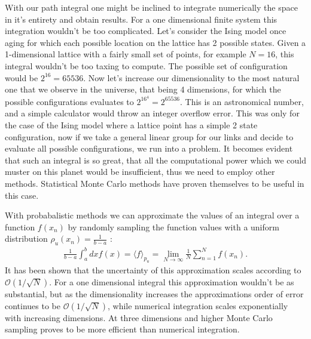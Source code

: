 \documentclass[english,twoside,openright]{UH_TCM_MSc}
\begin{document}
With our path integral one might be inclined to integrate numerically the space in it's entirety and obtain results. For a one dimensional finite system this integration wouldn't be too complicated. Let's consider the Ising model once aging for which each possible location on the lattice has 2 possible states. Given a 1-dimensional lattice with a fairly small set of points, for example $N=16$, this integral wouldn't be too taxing to compute. The possible set of configuration would be $2^{16}=65536$. Now let's increase our dimensionality to the most natural one that we observe in the universe, that being 4 dimensions, for which the possible configurations evaluates to $2^{16^4} = 2^{65536}$. This is an astronomical number, and a simple calculator would throw an integer overflow error. This was only for the case of the Ising model where a lattice point has a simple 2 state configuration, now if we take a general linear group for our links and decide to evaluate all possible configurations, we run into a problem. It becomes evident that such an integral is so great, that all the computational power which we could muster on this planet would be insufficient, thus we need to employ other methods. Statistical Monte Carlo methods have proven themselves to be useful in this case. 

With probabalistic methods we can approximate the values of an integral over a function $f(x_n)$ by randomly sampling the function values with a uniform distribution $\rho_u(x_n) = \frac{1}{b-a}$ \cite[ch. 4.1.1]{gattringer2009quantum}:
\begin{align}
    \frac{1}{b-a}\int_a^b dx f(x) = \langle f \rangle_{p_u} = \lim_{N\rightarrow \infty} \frac{1}{N}\sum_{n=1}^N f(x_n). \label{eq:sample_integral}
\end{align}
It has been shown that the uncertainty of this approximation scales according to $\mathcal{O}(1/\sqrt{N})$. For a one dimensional integral this approximation wouldn't be as substantial, but as the dimensionality increases the approximations order of error continues to be $\mathcal{O}(1/\sqrt{N})$, while numerical integration scales exponentially with increasing dimensions. At three dimensions and higher Monte Carlo sampling proves to be more efficient than numerical integration. 
\end{document}
